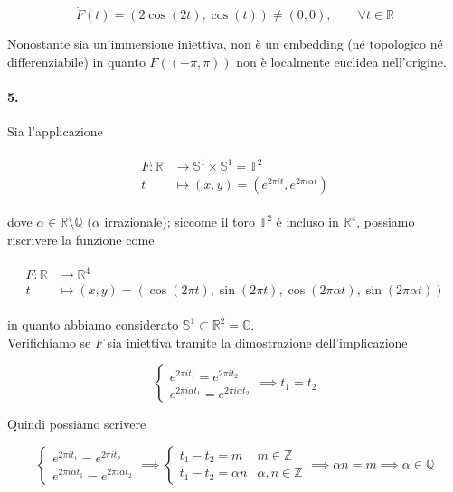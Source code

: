 \begin{equation}
	\dot{F}(t) = (2 \cos(2t), \cos(t)) \neq (0,0), \qquad \forall t \in \mathbb{R}
\end{equation}

Nonostante sia un'immersione iniettiva, non è un embedding (né topologico né differenziabile) in quanto $ F((-\pi,\pi)) $ non è localmente euclidea nell'origine.

\paragraph{5.}

Sia l'applicazione

\begin{align}
	\begin{split}
		F : \mathbb{R} &\to \mathbb{S}^{1} \times \mathbb{S}^{1} = \mathbb{T}^{2}\\
		t &\mapsto (x,y) = (e^{2 \pi i t}, e^{2 \pi i \alpha t})
	\end{split}
\end{align}

dove $ \alpha \in \mathbb{R} \setminus \mathbb{Q} $ ($ \alpha $ irrazionale); siccome il toro $ \mathbb{T}^{2} $ è incluso in $ \mathbb{R}^{4} $, possiamo riscrivere la funzione come

\begin{align}
	\begin{split}
		F : \mathbb{R} &\to \mathbb{R}^{4}\\
		t &\mapsto (x,y) = (\cos(2 \pi t), \sin(2 \pi t), \cos(2 \pi \alpha t), \sin(2 \pi \alpha t))
	\end{split}
\end{align}

in quanto abbiamo considerato $ \mathbb{S}^{1} \subset \mathbb{R}^{2} = \mathbb{C} $.\\
Verifichiamo se $ F $ sia iniettiva tramite la dimostrazione dell'implicazione

\begin{equation}
	\begin{cases}
		e^{2 \pi i t_{1}} = e^{2 \pi i t_{2}}\\
		e^{2 \pi i \alpha t_{1}} = e^{2 \pi i \alpha t_{2}}
	\end{cases}%
	\implies%
	t_{1} = t_{2}
\end{equation}

Quindi possiamo scrivere

\begin{equation}
	\begin{cases}
		e^{2 \pi i t_{1}} = e^{2 \pi i t_{2}}\\
		e^{2 \pi i \alpha t_{1}} = e^{2 \pi i \alpha t_{2}}
	\end{cases}%
	\implies%
	\begin{cases}
		t_{1} - t_{2} = m & m \in \mathbb{Z}\\
		t_{1} - t_{2} = \alpha n & \alpha,n \in \mathbb{Z}
	\end{cases}%
	\implies%
	\alpha n = m%
	\implies%
	\alpha \in \mathbb{Q}
\end{equation}

